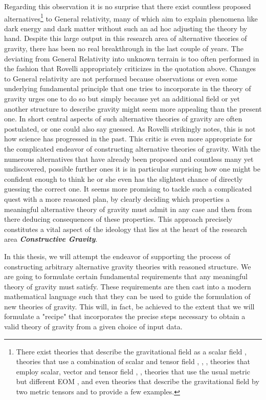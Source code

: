 \documentclass[a4paper,12pt, DIV=14, BCOR=5mm, twoside, headsepline, numbers=noenddot]{scrbook}
\begin{document}
Regarding this observation it is no surprise that there exist countless proposed alternatives\footnote{There exist theories that describe the gravitational field as a scalar field \cite{Scalar1} \cite{Scalar2}, theories that use a combination of scalar and tensor field \cite{ST1}, \cite{ST2}, \cite{ST3}, theories that employ scalar, vector and tensor field \cite{SVT1}, \cite{SVT2}, theories that use the usual metric but different EOM \cite{fR1}, \cite{fR2} and even theories that describe the gravitational field by two metric tensors \cite{BIM1} and \cite{BIM2} to provide a few examples.} to General relativity, many of which aim to explain phenomena like dark energy and dark matter without such an ad hoc adjusting the theory by hand. 
Despite this large output in this research area of alternative theories of gravity, there has been no real breakthrough in the last couple of years. 
The deviating from General Relativity into unknown terrain is too often performed in the fashion that Rovelli appropriately criticizes in the quotation above. Changes to General relativity are not performed because observations or even some underlying fundamental principle that one tries to incorporate in the theory of gravity urges one to do so but simply because yet an additional field or yet another structure to describe gravity might seem more appealing than the present one. In short central aspects of such alternative theories of gravity are often postulated, or one could also say guessed. As Rovelli strikingly notes, this is not how science has progressed in the past. This critic is even more appropriate for the complicated endeavor of constructing alternative theories of gravity. 
With the numerous alternatives that have already been proposed and countless many yet undiscovered, possible further ones it is in particular surprising how one might be confident enough to think he or she even has the slightest chance of directly guessing the correct one. It seems more promising to tackle such a complicated quest with a more reasoned plan, by clearly deciding which properties a meaningful alternative theory of gravity must admit in any case and then from there deducing consequences of these properties. 
This approach precisely constitutes a vital aspect of the ideology that lies at the heart of the research area \textit{\textbf{Constructive Gravity}}.

In this thesis, we will attempt the endeavor of supporting the process of constructing arbitrary alternative gravity theories with reasoned structure. 
We are going to formulate certain fundamental requirements that any meaningful theory of gravity must satisfy. These requirements are then cast into a modern mathematical language such that they can be used to guide the formulation of new theories of gravity. This will, in fact, be achieved to the extent that we will formulate a "recipe" that incorporates the precise steps necessary to obtain a valid theory of gravity from a given choice of input data. 
\end{document}
